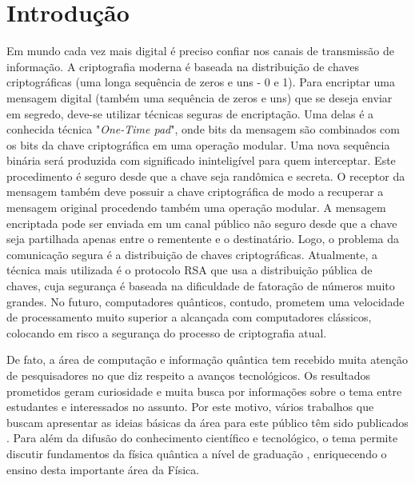\documentclass[pra, twocolumn]{revtex4}
\begin{document}
\maketitle

\section{Introdu\c{c}\~ao}

Em mundo cada vez mais digital \'e preciso confiar nos canais de transmiss\~ao de informa\c{c}\~ao. A criptografia moderna \'e baseada na distribui\c{c}\~ao de chaves criptogr\'aficas (uma longa sequ\^encia de zeros e uns - 0 e 1). Para encriptar uma mensagem digital (tamb\'em uma sequ\^encia de zeros e uns) que se deseja enviar em segredo, deve-se utilizar t\'ecnicas seguras de encripta\c{c}\~ao. Uma delas \'e a conhecida t\'ecnica "\textit{One-Time pad}"\cite{otp}, onde bits da mensagem s\~ao combinados com os bits da chave criptogr\'afica em uma opera\c{c}\~ao modular. Uma nova sequ\^encia bin\'aria ser\'a produzida com significado inintelig\'ivel para quem interceptar. Este procedimento \'e seguro desde que a chave seja rand\^omica e secreta. O receptor da mensagem tamb\'em deve possuir a chave criptogr\'afica de modo a recuperar a mensagem original procedendo tamb\'em uma opera\c{c}\~ao modular. A mensagem encriptada pode ser enviada em um canal p\'ublico n\~ao seguro desde que a chave seja partilhada apenas entre o rementente e o destinat\'ario. Logo, o problema da comunica\c{c}\~ao segura \'e a distribui\c{c}\~ao de chaves criptogr\'aficas. Atualmente, a t\'ecnica mais utilizada \'e o protocolo RSA \cite{rsa} que usa a distribui\c{c}\~ao p\'ublica de chaves, cuja seguran\c{c}a \'e baseada na dificuldade de fatora\c{c}\~ao de n\'umeros muito grandes. No futuro, computadores qu\^anticos, contudo, prometem uma velocidade de processamento muito superior a alcan\c{c}ada com computadores cl\'assicos, colocando em risco a seguran\c{c}a do processo de criptografia atual. 

De fato, a \'area de computa\c{c}\~ao e informa\c{c}\~ao qu\^antica tem recebido muita aten\c{c}\~ao de pesquisadores no que diz respeito a avan\c{c}os tecnol\'ogicos. Os resultados prometidos geram curiosidade e muita busca por informa\c{c}\~oes sobre o tema entre estudantes e interessados no assunto. Por este motivo, v\'arios trabalhos que buscam apresentar as ideias b\'asicas da \'area para este p\'ublico t\^em sido publicados \cite{iq1,iq2, iq3}. Para al\'em da difus\~ao do conhecimento cient\'ifico e tecnol\'ogico, o tema permite discutir fundamentos da f\'isica qu\^antica a n\'ivel de gradua\c{c}\~ao \cite{luiz}, enriquecendo o ensino desta importante \'area da F\'isica.
\end{document}
